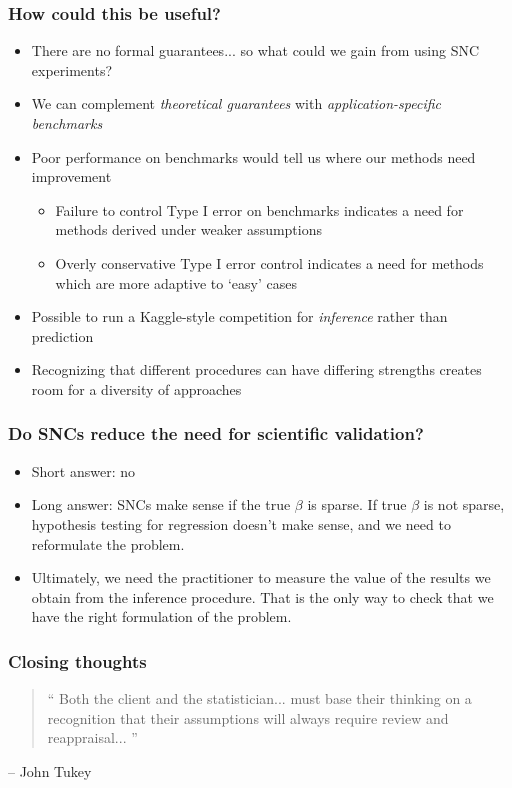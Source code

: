 \documentclass{beamer}
\begin{document}
\begin{frame}
\frametitle{How could this be useful?}
\begin{itemize}
\item<1-> There are no formal guarantees... so what could we gain from using SNC experiments?
\item<2-> We can complement \emph{theoretical guarantees} with \emph{application-specific benchmarks}
\item<3-> Poor performance on benchmarks would tell us where our methods need improvement
\begin{itemize}
\item Failure to control Type I error on benchmarks indicates a need for methods derived under weaker assumptions
\item Overly conservative Type I error control indicates a need for methods which are more adaptive to `easy' cases
\end{itemize}
\item<4-> Possible to run a Kaggle-style competition for \emph{inference} rather than prediction
\item<5-> Recognizing that different procedures can have differing strengths creates room for a diversity of approaches
\end{itemize}
\end{frame}

\begin{frame}
\frametitle{Do SNCs reduce the need for scientific validation?}
\begin{itemize}
\item<1-> Short answer: no
\item<1-> Long answer: SNCs make sense if the true $\beta$ is sparse.
  If true $\beta$ is not sparse, hypothesis testing for regression doesn't make sense, and we need to reformulate the problem.
\item<2> Ultimately, we need the practitioner to measure the value of
  the results we obtain from the inference procedure.
That is the only way to check that we have the right formulation of the problem.
\end{itemize}
\end{frame}

\begin{frame}
\frametitle{Closing thoughts}
\begin{quotation}
`` Both the client and the statistician... must base their thinking on
  a recognition that their assumptions will always require review and
  reappraisal...  ''
\end{quotation}
\hfill -- John Tukey
\end{frame}
\end{document}
